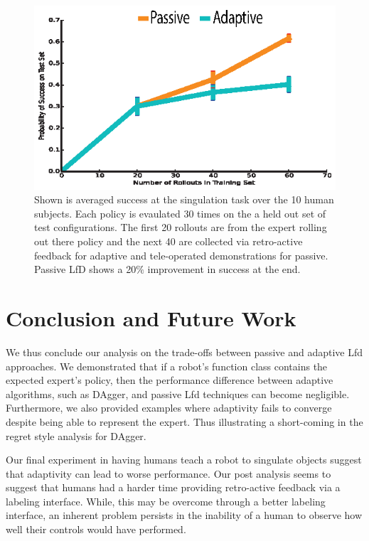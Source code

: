 \documentclass[10pt, conference]{ieeeconf}      %
\begin{document}
\begin{figure}
\centering
\includegraphics{f_figs/izzy_reward.eps}
\caption{
    \footnotesize
Shown is averaged success at the singulation task over the 10 human subjects. Each policy is evaulated 30 times on the a held out set of test configurations. The first 20 rollouts are from the expert rolling out there policy and the next 40 are collected via retro-active feedback for adaptive and tele-operated demonstrations for passive. Passive LfD shows a 20$\%$ improvement in success at the end. }
\vspace*{-20pt}
\label{fig:izzy_rw}
\end{figure}



\section{Conclusion and Future Work}
We thus conclude our analysis on the trade-offs between passive and adaptive Lfd approaches. We demonstrated that if a robot's function class contains the expected expert's policy, then the  performance difference between adaptive algorithms, such as DAgger,  and passive Lfd techniques can become negligible.  Furthermore, we also provided examples where adaptivity fails to converge despite being able to represent the expert. Thus illustrating a short-coming in the regret style analysis for DAgger. 

Our final experiment in having humans teach a robot to singulate objects suggest that adaptivity can lead to worse performance. Our post analysis seems to suggest that humans had a harder time providing retro-active feedback via a labeling interface. While, this may be overcome through a better labeling interface, an inherent problem persists in the inability of a human to observe how well their controls would have performed. 
\end{document}
